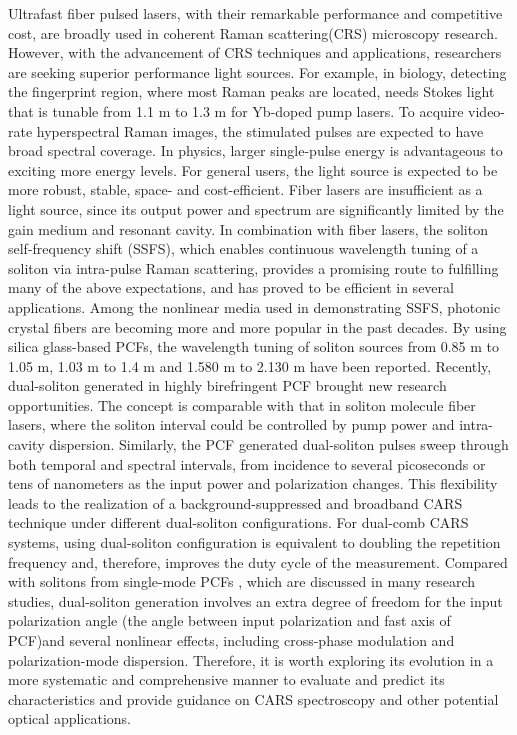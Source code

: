 \documentclass{osa-article}
\begin{document}
Ultrafast fiber pulsed lasers, with their remarkable performance and competitive cost, are broadly used in coherent Raman scattering(CRS) microscopy research\cite{andresen_tunable_2006, andresen_stimulated_2011, Gottschall.2015, Krafft.2016}. However, with the advancement of CRS techniques and applications, researchers are seeking superior performance light sources. For example, in biology, detecting the fingerprint region, where most Raman peaks are located, needs Stokes light that is tunable from 1.1 \textmu m to 1.3 \textmu m for Yb-doped pump lasers\cite{Gottschall.2015}. To acquire video-rate hyperspectral Raman images, the stimulated pulses are expected to have broad spectral coverage. In physics, larger single-pulse energy is advantageous to exciting more energy levels. For general users, the light source is expected to be more robust, stable, space- and cost-efficient. Fiber lasers are insufficient as a light source, since its output power and spectrum are significantly limited by the gain medium and resonant cavity. In combination with fiber lasers, the soliton self-frequency shift (SSFS), which enables continuous wavelength tuning of a soliton via intra-pulse Raman scattering, provides a promising route to fulfilling many of the above expectations, and has proved to be efficient in several applications\cite{Paulsen2003,yuan_red-shifted_2015,Li.2017}. Among the nonlinear media used in demonstrating SSFS, photonic crystal fibers are becoming more and more popular in the past decades. By using silica glass-based PCFs, the wavelength tuning of soliton sources from 0.85 \textmu m to 1.05 \textmu m\cite{Su2013}, 1.03 \textmu m to 1.4 \textmu m\cite{Andresen.2007} and 1.580 \textmu m to 2.130 \textmu m\cite{wang.2011} have been reported. Recently, dual-soliton generated in highly birefringent PCF brought new research opportunities. The concept is comparable with that in soliton molecule fiber lasers, where the soliton interval could be controlled by pump power and intra-cavity dispersion\cite{Li.2012,Li.2014}. Similarly, the PCF generated dual-soliton pulses sweep through both temporal and spectral intervals, from incidence to several picoseconds or tens of nanometers as the input power and polarization changes. This flexibility leads to the realization of a background-suppressed\cite{chen_dual-soliton_2016} and broadband\cite{chen_cascaded_2016} CARS technique under different dual-soliton configurations. For dual-comb CARS systems\cite{ideguchi_coherent_2013, mohler_dual-comb_2017}, using dual-soliton configuration is equivalent to doubling the repetition frequency and, therefore, improves the duty cycle of the measurement. Compared with solitons from single-mode PCFs \cite{klarskov_supercontinuum_2011,arteaga-sierra_supercontinuum_2014,Qiu.2014}, which are discussed in many research studies, dual-soliton generation involves an extra degree of freedom for the input polarization angle (the angle between input polarization and fast axis of PCF)and several nonlinear effects, including cross-phase modulation and polarization-mode dispersion. Therefore, it is worth exploring its evolution in a more systematic and comprehensive manner to evaluate and predict its characteristics and provide guidance on CARS spectroscopy and other potential optical applications. 
\end{document}

